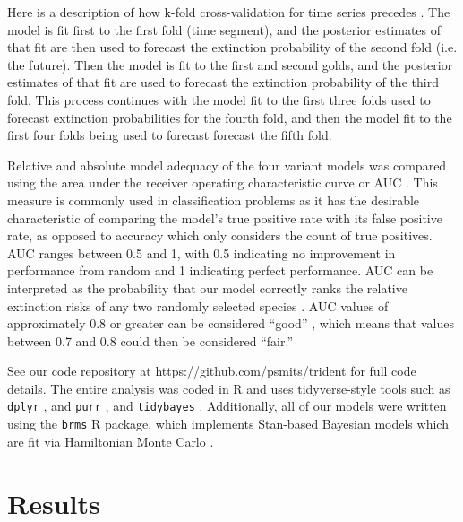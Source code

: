 \documentclass[12pt,letterpaper]{article}
\begin{document}
\begin{refsection}
Here is a description of how k-fold cross-validation for time series precedes \citep{Arlot2010,Bergmeir2016}. The model is fit first to the first fold (time segment), and the posterior estimates of that fit are then used to forecast the extinction probability of the second fold (i.e. the future). Then the model is fit to the first and second golds, and the posterior estimates of that fit are used to forecast the extinction probability of the third fold. This process continues with the model fit to the first three folds used to forecast extinction probabilities for the fourth fold, and then the model fit to the first four folds being used to forecast forecast the fifth fold. 

Relative and absolute model adequacy of the four variant models was compared using the area under the receiver operating characteristic curve or AUC \citep{Fawcett2006,Mason2002}. This measure is commonly used in classification problems as it has the desirable characteristic of comparing the model's true positive rate with its false positive rate, as opposed to accuracy which only considers the count of true positives. AUC ranges between 0.5 and 1, with 0.5 indicating no improvement in performance from random and 1 indicating perfect performance. AUC can be interpreted as the probability that our model correctly ranks the relative extinction risks of any two randomly selected species \citep{Fawcett2006,Mason2002}. AUC values of approximately 0.8 or greater can be considered ``good'' \citep{ACCDA}, which means that values between 0.7 and 0.8 could then be considered ``fair.''


See our code repository at https://github.com/psmits/trident for full code details. The entire analysis was coded in R and uses tidyverse-style tools such as \texttt{dplyr} \citep{dplyr}, and \texttt{purr} \citep{purrr}, and \texttt{tidybayes} \citep{tidybayes}. Additionally, all of our models were written using the \texttt{brms} \citep{brms2017,brms2018} R package, which implements Stan-based Bayesian models which are fit via Hamiltonian Monte Carlo \citep{StanManual}.


\section{Results}


\end{refsection}
\end{document}
